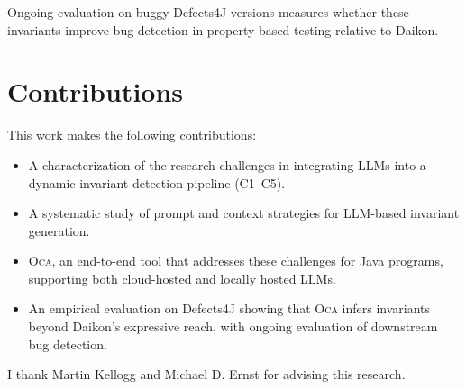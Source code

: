 \documentclass[sigplan,screen]{acmart}
\begin{document}
Ongoing evaluation on buggy Defects4J versions measures whether these invariants improve bug detection in property-based testing relative to Daikon.

\section{Contributions}

This work makes the following contributions:

\begin{itemize}
  \item A characterization of the research challenges in integrating LLMs
        into a dynamic invariant detection pipeline (C1--C5).
  \item A systematic study of prompt and context strategies for LLM-based invariant generation.
  \item \textsc{Oca}, an end-to-end tool that addresses these challenges
        for Java programs, supporting both cloud-hosted and locally hosted LLMs.
  \item An empirical evaluation on Defects4J showing that \textsc{Oca}
        infers invariants beyond Daikon's expressive reach,
        with ongoing evaluation of downstream bug detection.
\end{itemize}

\begin{acks}
I thank Martin Kellogg and Michael D. Ernst for advising this research.
\end{acks}

\balance
\end{document}
